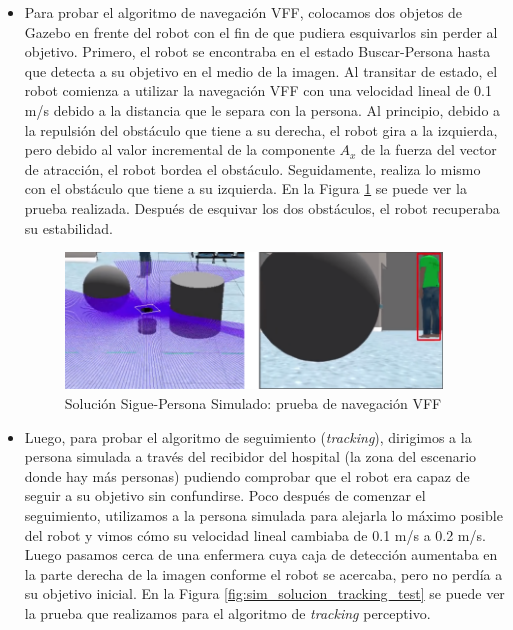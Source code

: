 \begin{itemize}
	\item Para probar el algoritmo de navegación VFF, colocamos dos objetos de Gazebo en frente del robot con el fin de que pudiera esquivarlos sin perder al objetivo. Primero, el robot se encontraba en el estado Buscar-Persona hasta que detecta a su objetivo en el medio de la imagen. Al transitar de estado, el robot comienza a utilizar la navegación VFF con una velocidad lineal de 0.1 m/s debido a la distancia que le separa con la persona. Al principio, debido a la repulsión del obstáculo que tiene a su derecha, el robot gira a la izquierda, pero debido al valor incremental de la componente $A_{x}$ de la fuerza del vector de atracción, el robot bordea el obstáculo. Seguidamente, realiza lo mismo con el obstáculo que tiene a su izquierda. En la Figura \ref{fig:sim_solucion_vff_test} se puede ver la prueba realizada. Después de esquivar los dos obstáculos, el robot recuperaba su estabilidad.
	
	\begin{figure} [H]
		\begin{center}
		\includegraphics[width=10cm]{imagenes/cap6/sim-solution-vff-test.png}
		\end{center}
		\caption[Solución Sigue-Persona Simulado: prueba de navegación VFF]{Solución Sigue-Persona Simulado: prueba de navegación VFF}
		\label{fig:sim_solucion_vff_test}
	\end{figure}

	\item Luego, para probar el algoritmo de seguimiento (\textit{tracking}), dirigimos a la persona simulada a través del recibidor del hospital (la zona del escenario donde hay más personas) pudiendo comprobar que el robot era capaz de seguir a su objetivo sin confundirse. Poco después de comenzar el seguimiento, utilizamos a la persona simulada para alejarla lo máximo posible del robot y vimos cómo su velocidad lineal cambiaba de 0.1 m/s a 0.2 m/s. Luego pasamos cerca de una enfermera cuya caja de detección aumentaba en la parte derecha de la imagen conforme el robot se acercaba, pero no perdía a su objetivo inicial. En la Figura \ref{fig:sim_solucion_tracking_test} se puede ver la prueba que realizamos para el algoritmo de \textit{tracking} perceptivo.


\end{itemize}
